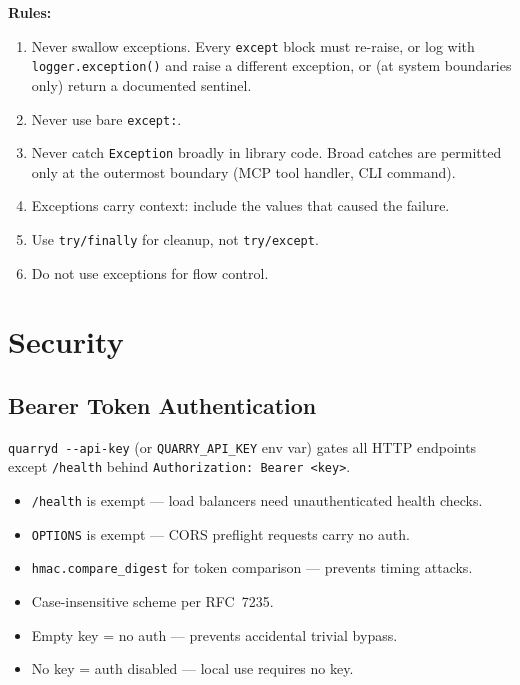 \documentclass[a4paper,10pt]{article}
\begin{document}
\textbf{Rules:}

\begin{enumerate}
  \item Never swallow exceptions.  Every \texttt{except} block must
    re-raise, or log with \texttt{logger.exception()} and raise a
    different exception, or (at system boundaries only) return a
    documented sentinel.
  \item Never use bare \texttt{except:}.
  \item Never catch \texttt{Exception} broadly in library code.  Broad
    catches are permitted only at the outermost boundary (MCP tool
    handler, CLI command).
  \item Exceptions carry context: include the values that caused the
    failure.
  \item Use \texttt{try/finally} for cleanup, not
    \texttt{try/except}.
  \item Do not use exceptions for flow control.
\end{enumerate}

\section{Security}

\subsection{Bearer Token Authentication}

\texttt{quarryd -{}-api-key} (or \texttt{QUARRY\_API\_KEY} env var)
gates all HTTP endpoints except \texttt{/health} behind
\texttt{Authorization: Bearer <key>}.

\begin{itemize}
  \item \texttt{/health} is exempt --- load balancers need
    unauthenticated health checks.
  \item \texttt{OPTIONS} is exempt --- CORS preflight requests carry
    no auth.
  \item \texttt{hmac.compare\_digest} for token comparison ---
    prevents timing attacks.
  \item Case-insensitive scheme per RFC~7235.
  \item Empty key = no auth --- prevents accidental trivial bypass.
  \item No key = auth disabled --- local use requires no key.
\end{itemize}
\end{document}
